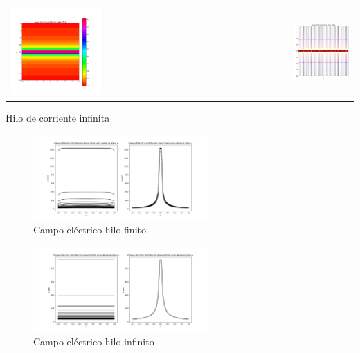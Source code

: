 \documentclass[11pt]{article}
\begin{document}
    \vspace{0.8cm}\begin{tabular}{lr}
        \centering
        \includegraphics[width=0.45\textwidth]{infinita2.png} &      \includegraphics[width=0.45\textwidth]{infinita3.png}
    \end{tabular}
    \vspace{1mm} \begin{center}
         Hilo de corriente infinita
    \end{center}

    \clearpage
        \begin{figure}[h]
            \centering
            \includegraphics[width=0.6\textwidth]{finita1.png}
            \caption{Campo eléctrico hilo finito}
        \end{figure}

        \begin{figure}[h]
            \centering
            \includegraphics[width=0.6\textwidth]{infinita1.png}
            \caption{Campo eléctrico hilo infinito}
        \end{figure}
\end{document}
